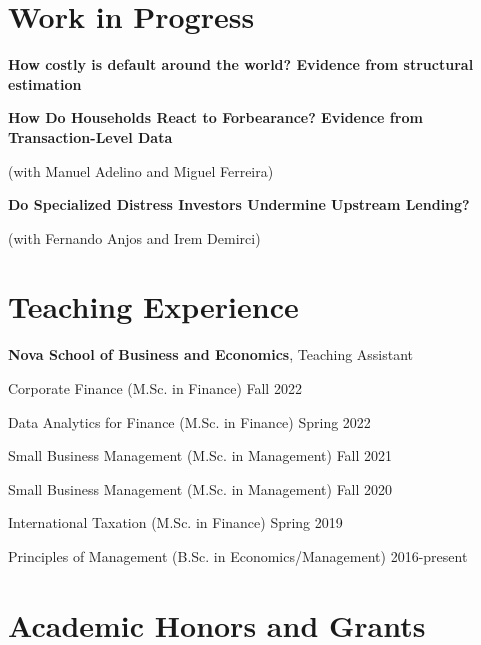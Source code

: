 \documentclass[letterpaper]{article}
\newenvironment{itemize*}{
  \begin{list}{}{
    \setlength{\leftmargin}{1.5em}
  }
}{
  \end{list}
}
\begin{document}
\section*{Work in Progress}

\begin{itemize*}
\item \textbf{How costly is default around the world? Evidence from structural estimation}

\medskip

\item \textbf{How Do Households React to Forbearance? Evidence from Transaction-Level Data}

	(with Manuel Adelino and Miguel Ferreira)
\medskip
	
\item \textbf{Do Specialized Distress Investors Undermine Upstream Lending?}

	(with Fernando Anjos and Irem Demirci)

\end{itemize*}

\section*{Teaching Experience}

\begin{itemize*} 
\item \textbf{Nova School of Business and Economics}, Teaching Assistant
\begin{itemize*}
\item Corporate Finance (M.Sc. in Finance) \hfill Fall 2022
\item Data Analytics for Finance (M.Sc. in Finance) \hfill Spring 2022
\item Small Business Management (M.Sc. in Management)  \hfill Fall 2021
\item Small Business Management (M.Sc. in Management)  \hfill Fall 2020
\item International Taxation (M.Sc. in Finance) \hfill Spring 2019
\item Principles of Management (B.Sc. in Economics/Management) \hfill 2016-present
\end{itemize*}
\end{itemize*}

\section*{Academic Honors and Grants}
\end{document}
